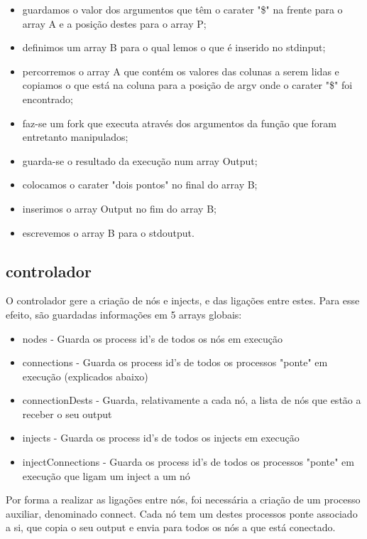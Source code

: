 \documentclass[a4paper]{article}
\begin{document}
\begin{itemize}
\item guardamos o valor dos argumentos que têm o carater "\$" na frente para o array A e a posição destes para o array P;
\item definimos um array B para o qual lemos o que é inserido no stdinput;
\item percorremos o array A que contém os valores das colunas a serem lidas e copiamos o que está na coluna para a posição de argv onde o carater "\$" foi encontrado;
\item faz-se um fork que executa através dos argumentos da função que foram entretanto manipulados;
\item guarda-se o resultado da execução num array Output;
\item colocamos o carater "dois pontos" no final do array B;
\item inserimos o array Output no fim do array B;
\item escrevemos o array B para o stdoutput.
\end{itemize}

\subsection{controlador}
O controlador gere a criação de nós e injects, e das ligações entre estes. Para esse efeito, são guardadas informações em 5 arrays globais:

\begin{itemize}
\item nodes - Guarda os process id's de todos os nós em execução

\item connections - Guarda os process id's de todos os processos "ponte" em execução (explicados abaixo)

\item connectionDests - Guarda, relativamente a cada nó, a lista de nós que estão a receber o seu output

\item injects - Guarda os process id's de todos os injects em execução

\item injectConnections - Guarda os process id's de todos os processos "ponte" em execução que ligam um inject a um nó
\end{itemize}

 Por forma a realizar as ligações entre nós, foi necessária a criação de um processo auxiliar, denominado connect. Cada nó tem um destes processos ponte associado a si, que copia o seu output e envia para todos os nós a que está conectado.
\end{document}
